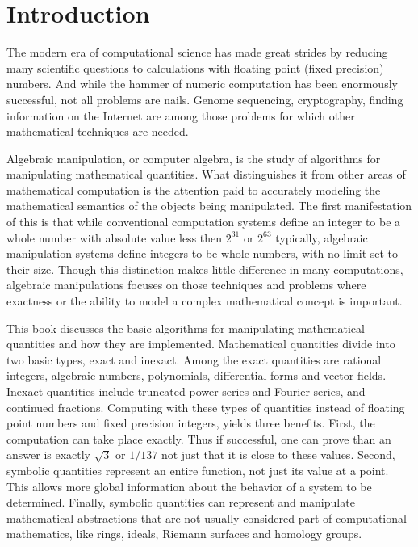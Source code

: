 \chapter{Introduction}

The modern era of computational science has made great strides by
reducing many scientific questions to calculations with floating point
(fixed precision) numbers. And while the hammer of numeric computation
has been enormously successful, not all problems are nails. Genome
sequencing, cryptography, finding information on the Internet are
among those problems for which other mathematical techniques are
needed.

Algebraic manipulation, or computer algebra, is the study of
algorithms for manipulating mathematical quantities.  What
distinguishes it from other areas of mathematical computation is the
attention paid to accurately modeling the mathematical semantics of
the objects being manipulated.  The first manifestation of this is
that while conventional computation systems define an integer to be a
whole number with absolute value less then $2^{31}$ or $2^{63}$
typically, algebraic manipulation systems define integers to be whole
numbers, with no limit set to their size.  Though this distinction
makes little difference in many computations, algebraic manipulations
focuses on those techniques and problems where exactness or the
ability to model a complex mathematical concept is important.

This book discusses the basic algorithms for manipulating mathematical
quantities and how they are implemented.  Mathematical quantities divide
into two basic types, exact and inexact.  Among the exact quantities are
rational integers, algebraic numbers, polynomials, differential forms and
vector fields.  Inexact quantities include truncated power series and
Fourier series, and continued fractions.  Computing with these types of
quantities instead of floating point numbers and fixed precision integers,
yields three benefits.  First, the computation can take place exactly. Thus
if successful, one can prove than an answer is exactly $\sqrt{3}$ or
$1/137$ not just that it is close to these values.  Second, symbolic
quantities represent an entire function, not just its value at a point.
This allows more global information about the behavior of a system to be
determined.  Finally, symbolic quantities can represent and manipulate
mathematical abstractions that are not usually considered part of
computational mathematics, like rings, ideals, Riemann surfaces and
homology groups.

